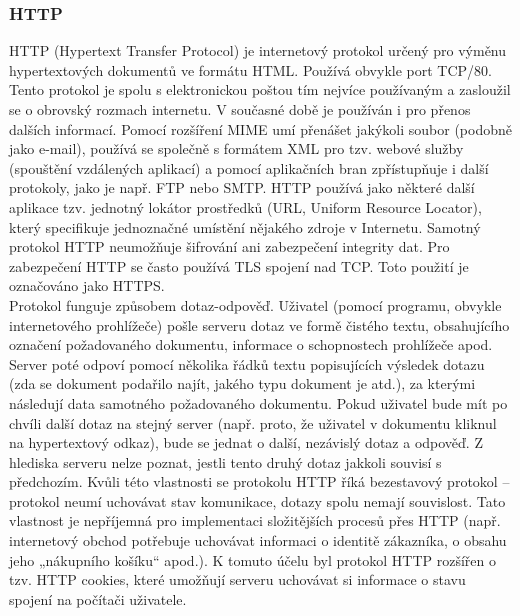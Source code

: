 \documentclass[10pt,a4paper]{article}
\begin{document}
\subsubsection{HTTP}
HTTP (Hypertext Transfer Protocol) je internetový protokol určený pro výměnu hypertextových dokumentů ve formátu HTML. Používá obvykle port TCP/80. Tento protokol je spolu s elektronickou poštou tím nejvíce používaným a zasloužil se o obrovský rozmach internetu. V současné době je používán i pro přenos dalších informací. Pomocí rozšíření MIME umí přenášet jakýkoli soubor (podobně jako e-mail), používá se společně s formátem XML pro tzv. webové služby (spouštění vzdálených aplikací) a pomocí aplikačních bran zpřístupňuje i další protokoly, jako je např. FTP nebo SMTP. HTTP používá jako některé další aplikace tzv. jednotný lokátor prostředků (URL, Uniform Resource Locator), který specifikuje jednoznačné umístění nějakého zdroje v Internetu. Samotný protokol HTTP neumožňuje šifrování ani zabezpečení integrity dat. Pro zabezpečení HTTP se často používá TLS spojení nad TCP. Toto použití je označováno jako HTTPS. \\
Protokol funguje způsobem dotaz-odpověď. Uživatel (pomocí programu, obvykle internetového prohlížeče) pošle serveru dotaz ve formě čistého textu, obsahujícího označení požadovaného dokumentu, informace o schopnostech prohlížeče apod. Server poté odpoví pomocí několika řádků textu popisujících výsledek dotazu (zda se dokument podařilo najít, jakého typu dokument je atd.), za kterými následují data samotného požadovaného dokumentu. Pokud uživatel bude mít po chvíli další dotaz na stejný server (např. proto, že uživatel v dokumentu kliknul na hypertextový odkaz), bude se jednat o další, nezávislý dotaz a odpověď. Z hlediska serveru nelze poznat, jestli tento druhý dotaz jakkoli souvisí s předchozím. Kvůli této vlastnosti se protokolu HTTP říká bezestavový protokol – protokol neumí uchovávat stav komunikace, dotazy spolu nemají souvislost. Tato vlastnost je nepříjemná pro implementaci složitějších procesů přes HTTP (např. internetový obchod potřebuje uchovávat informaci o identitě zákazníka, o obsahu jeho „nákupního košíku“ apod.). K tomuto účelu byl protokol HTTP rozšířen o tzv. HTTP cookies, které umožňují serveru uchovávat si informace o stavu spojení na počítači uživatele. \\
\end{document}

